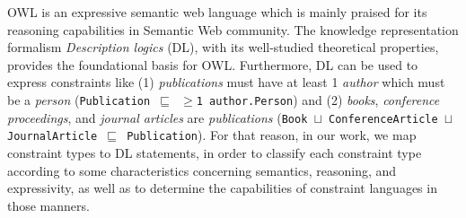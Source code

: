 \documentclass{llncs}
\newcommand{\ms}[1]{\texttt{#1}}
\begin{document}
%
%
OWL is an expressive semantic web language which  is mainly praised for its reasoning capabilities in Semantic Web community. The knowledge representation formalism {\em Description logics} (DL), with its  well-studied theoretical properties, provides the foundational basis for OWL. Furthermore, DL can be used to express constraints like (1) \emph{publications} must have at least 1 \emph{author} which must be a \emph{person} (\ms{Publication $\sqsubseteq$ $\geq$1 author.Person}) and
(2) \emph{books}, \emph{conference proceedings}, and \emph{journal articles} are \emph{publications} (\ms{Book $\sqcup$ ConferenceArticle $\sqcup$ JournalArticle $\sqsubseteq$ Publication}). For that reason, in our work, we map constraint types to DL statements, in order to classify each constraint type according to some characteristics concerning semantics, reasoning, and expressivity, as well as to determine the capabilities of constraint languages in those manners.
\end{document}
